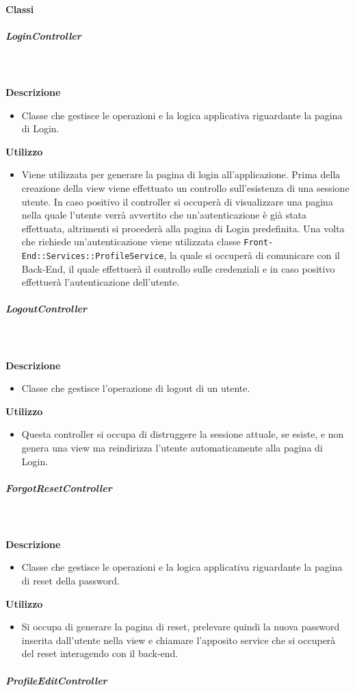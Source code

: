 		\paragraph{Classi}
			\subparagraph{LoginController}
				
				\textbf{\\ \\ Descrizione} 
					\begin{itemize}
						\item[] Classe che gestisce le operazioni e la logica applicativa riguardante la pagina di Login.
					\end{itemize}      
				\textbf{Utilizzo}  
					\begin{itemize}
						\item[] Viene utilizzata per generare la pagina di login all'applicazione. Prima della creazione della view viene effettuato un controllo sull'esistenza di una sessione utente. In caso positivo il controller si occuperà di visualizzare una pagina nella quale l'utente verrà avvertito che un'autenticazione è già stata effettuata, altrimenti si procederà alla pagina di Login predefinita. Una volta che richiede un'autenticazione viene utilizzata classe \texttt{Front-End::Services::ProfileService}, la quale si occuperà di comunicare con il Back-End, il quale effettuerà il controllo sulle credenziali e in caso positivo effettuerà l'autenticazione dell'utente.
					\end{itemize}
			\subparagraph{LogoutController}
				
				\textbf{\\ \\ Descrizione} 
					\begin{itemize}
						\item[] Classe che gestisce l'operazione di logout di un utente.
					\end{itemize}      
				\textbf{Utilizzo}  
					\begin{itemize}
						\item[] Questa controller si occupa di distruggere la sessione attuale, se esiste, e non genera una view ma reindirizza l'utente automaticamente alla pagina di Login.
					\end{itemize}
			\subparagraph{ForgotResetController}
				
				\textbf{\\ \\ Descrizione} 
					\begin{itemize}
						\item[] Classe che gestisce le operazioni e la logica applicativa riguardante la pagina di reset della password.
					\end{itemize}      
				\textbf{Utilizzo}  
					\begin{itemize}
						\item[] Si occupa di generare la pagina di reset, prelevare quindi la nuova password inserita dall'utente nella view e chiamare l'apposito service che si occuperà del reset interagendo con il back-end.
					\end{itemize}
			\subparagraph{ProfileEditController}
				
